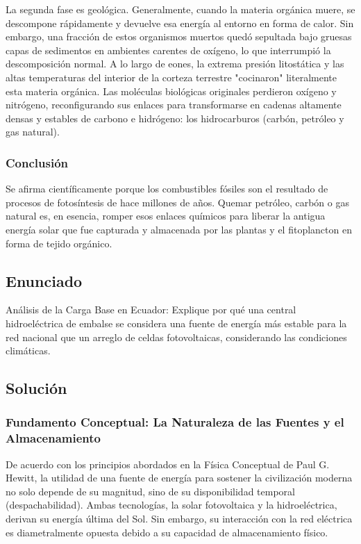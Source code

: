 \documentclass[12pt,a4paper]{article}
\begin{document}
La segunda fase es geológica. Generalmente, cuando la materia orgánica muere, se descompone rápidamente y devuelve esa energía al entorno en forma de calor. Sin embargo, una fracción de estos organismos muertos quedó sepultada bajo gruesas capas de sedimentos en ambientes carentes de oxígeno, lo que interrumpió la descomposición normal. A lo largo de eones, la extrema presión litostática y las altas temperaturas del interior de la corteza terrestre "cocinaron" literalmente esta materia orgánica. Las moléculas biológicas originales perdieron oxígeno y nitrógeno, reconfigurando sus enlaces para transformarse en cadenas altamente densas y estables de carbono e hidrógeno: los hidrocarburos (carbón, petróleo y gas natural). 

\subsubsection*{Conclusión}
Se afirma científicamente porque los combustibles fósiles son el resultado de procesos de fotosíntesis de hace millones de años. Quemar petróleo, carbón o gas natural es, en esencia, romper esos enlaces químicos para liberar la antigua energía solar que fue capturada y almacenada por las plantas y el fitoplancton en forma de tejido orgánico.

\newpage

\subsection*{Enunciado}
Análisis de la Carga Base en Ecuador: Explique por qué una central hidroeléctrica de embalse se considera una fuente de energía más estable para la red nacional que un arreglo de celdas fotovoltaicas, considerando las condiciones climáticas.

\subsection*{Solución}

\subsubsection*{Fundamento Conceptual: La Naturaleza de las Fuentes y el Almacenamiento}
De acuerdo con los principios abordados en la Física Conceptual de Paul G. Hewitt, la utilidad de una fuente de energía para sostener la civilización moderna no solo depende de su magnitud, sino de su disponibilidad temporal (despachabilidad). Ambas tecnologías, la solar fotovoltaica y la hidroeléctrica, derivan su energía última del Sol. Sin embargo, su interacción con la red eléctrica es diametralmente opuesta debido a su capacidad de almacenamiento físico.
\end{document}
